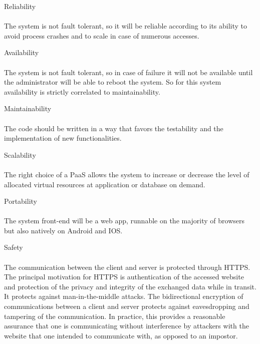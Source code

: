 \documentclass{article}
\begin{document}
\begin{legal}
\begin{legal}
		\begin{legal}\bfseries
			\item Reliability
			\\\\
			{\normalfont The system is not fault tolerant, so it will be reliable according to its ability to avoid process crashes and to scale in case of numerous accesses.}
			\\
			\item Availability
			\\\\
			{\normalfont The system is not fault tolerant, so in case of failure it will not be available until the administrator will be able to reboot the system. So for this system availability is strictly correlated to maintainability.}
			\\
			\item Maintainability
			\\\\
			{\normalfont The code should be written in a way that favors the testability and the implementation of new functionalities.}
			\\
			\item Scalability
			\\\\
			{\normalfont The right choice of a PaaS allows the system to increase or decrease the level of allocated virtual resources at application or database on demand.}
			\\
			\item Portability
			\\\\
			{\normalfont The system front-end will be a web app, runnable on the majority of browsers but also natively on Android and IOS.}
			\\
			\item Safety
			\\\\
			{\normalfont The communication between the client and server is protected through HTTPS. The principal motivation for HTTPS is authentication of the accessed website and protection of the privacy and integrity of the exchanged data while in transit. It protects against man-in-the-middle attacks. The bidirectional encryption of communications between a client and server protects against eavesdropping and tampering of the communication. In practice, this provides a reasonable assurance that one is communicating without interference by attackers with the website that one intended to communicate with, as opposed to an impostor. }
			\\
			
			
		\end{legal}
		\end{legal}

	\end{legal}
\end{document}

